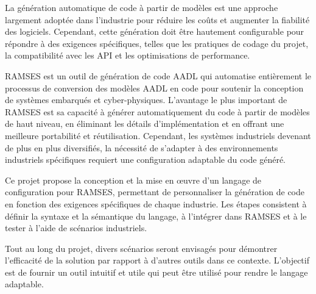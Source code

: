 
%

La génération automatique de code à partir de modèles est une approche largement adoptée dans l'industrie pour réduire les coûts et augmenter la fiabilité des logiciels. Cependant, cette génération doit être hautement configurable pour répondre à des exigences spécifiques, telles que les pratiques de codage du projet, la compatibilité avec les API et les optimisations de performance.

RAMSES est un outil de génération de code AADL qui automatise entièrement le processus de conversion des modèles AADL en code pour soutenir la conception de systèmes embarqués et cyber-physiques. L'avantage le plus important de RAMSES est sa capacité à générer automatiquement du code à partir de modèles de haut niveau, en éliminant les détails d'implémentation et en offrant une meilleure portabilité et réutilisation. Cependant, les systèmes industriels devenant de plus en plus diversifiés, la nécessité de s'adapter à des environnements industriels spécifiques requiert une configuration adaptable du code généré.

Ce projet propose la conception et la mise en œuvre d'un langage de configuration pour RAMSES, permettant de personnaliser la génération de code en fonction des exigences spécifiques de chaque industrie. Les étapes consistent à définir la syntaxe et la sémantique du langage, à l'intégrer dans RAMSES et à le tester à l'aide de scénarios industriels.

Tout au long du projet, divers scénarios seront envisagés pour démontrer l'efficacité de la solution par rapport à d'autres outils dans ce contexte. L'objectif est de fournir un outil intuitif et utile qui peut être utilisé pour rendre le langage adaptable.

